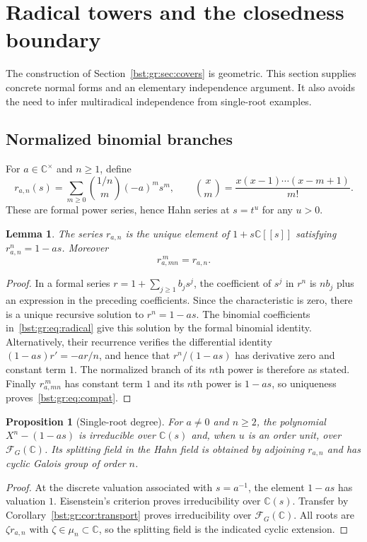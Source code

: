 \documentclass[11pt,letterpaper]{article}
\newtheorem{lemma}[theorem]{Lemma}
\newtheorem{proposition}[theorem]{Proposition}
\theoremstyle{definition}
\theoremstyle{remark}
\newcommand{\C}{\mathbb C}
\newcommand{\FF}[2]{\mathcal F_{#2}(#1)}
\begin{document}
\section{Radical towers and the closedness boundary}\label{bst:gr:sec:radicals}

The construction of Section~\ref{bst:gr:sec:covers} is geometric. This
section supplies concrete normal forms and an elementary independence
argument. It also avoids the need to infer multiradical independence from
single-root examples.

\subsection{Normalized binomial branches}

For $a\in\C^\times$ and $n\geq1$, define
\begin{equation}\label{bst:gr:eq:radical}
 r_{a,n}(s)=\sum_{m\geq0}\binom{1/n}{m}(-a)^m s^m,
 \qquad
 \binom{x}{m}=\frac{x(x-1)\cdots(x-m+1)}{m!}.
\end{equation}
These are formal power series, hence Hahn series at $s=t^u$ for any $u>0$.

\begin{lemma}\label{bst:gr:lem:binomial}
The series $r_{a,n}$ is the unique element of $1+s\C[[s]]$ satisfying
$r_{a,n}^n=1-as$. Moreover
\begin{equation}\label{bst:gr:eq:compat}
 r_{a,mn}^{\,m}=r_{a,n}.
\end{equation}
\end{lemma}
\begin{proof}
In a formal series $r=1+\sum_{j\geq1}b_js^j$, the coefficient of $s^j$ in
$r^n$ is $nb_j$ plus an expression in the preceding coefficients. Since the
characteristic is zero, there is a unique recursive solution to $r^n=1-as$.
The binomial coefficients in~\eqref{bst:gr:eq:radical} give this solution by
the formal binomial identity. Alternatively, their recurrence verifies the
differential identity $(1-as)r'=-ar/n$, and hence that $r^n/(1-as)$ has
derivative zero and constant term $1$. The normalized branch of its $n$th
power is therefore as stated. Finally $r_{a,mn}^{\,m}$ has constant term $1$
and its $n$th power is $1-as$, so uniqueness proves~\eqref{bst:gr:eq:compat}.
\end{proof}

\begin{proposition}[Single-root degree]\label{bst:gr:prop:single}
For $a\ne0$ and $n\geq2$, the polynomial $X^n-(1-as)$ is irreducible over
$\C(s)$ and, when $u$ is an order unit, over $\FF{\C}G$. Its splitting field
in the Hahn field is obtained by adjoining $r_{a,n}$ and has cyclic Galois
group of order $n$.
\end{proposition}
\begin{proof}
At the discrete valuation associated with $s=a^{-1}$, the element $1-as$ has
valuation $1$. Eisenstein's criterion proves irreducibility over $\C(s)$.
Transfer by Corollary~\ref{bst:gr:cor:transport} proves irreducibility over
$\FF{\C}G$. All roots are $\zeta r_{a,n}$ with $\zeta\in\mu_n\subset\C$, so
the splitting field is the indicated cyclic extension.
\end{proof}
\end{document}
